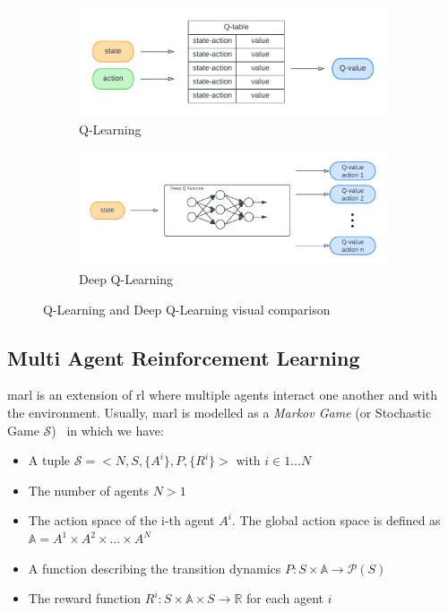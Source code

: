  \begin{figure}[t]
    \begin{subfigure}[b]{0.49\textwidth}
        \centering
        \includegraphics[width=\textwidth]{papers/coordination2023/imgs/q-learning.pdf}
        \caption{Q-Learning}
        \label{fig:ql}
    \end{subfigure}
    \begin{subfigure}[b]{0.49\textwidth}
        \centering
        \includegraphics[width=\textwidth]{papers/coordination2023/imgs/deepQL.pdf}
        \caption{Deep Q-Learning}
        \label{fig:dqn}
    \end{subfigure}
\caption{Q-Learning and Deep Q-Learning visual comparison}\vspace{-10pt}
\end{figure}


\subsection{Multi Agent Reinforcement Learning}
\ac{marl} is an extension of \ac{rl} where multiple agents 
 interact one another and with the environment. 
 Usually, \ac{marl} is modelled as a 
 \emph{Markov Game} (or Stochastic Game $\mathcal{S}$)~\cite{LITTMAN1994157} in which we have:
 \begin{itemize}
    \item A tuple $\mathcal{S} = <N, S, \{A^i\}, P, \{R^i\}>$ with $i \in 1 \dots N$
    \item The number of agents $N > 1$
    \item The action space of the i-th agent $A^i$. The global action space is defined as $\mathbb{A} = A^1 \times A^2 \times \dots \times A^N$
    \item A function describing the transition dynamics $P: S \times \mathbb{A} \rightarrow \mathcal{P}(S)$
    \item The reward function $R^i: S \times \mathbb{A} \times S \rightarrow \mathbb{R}$ for each agent $i$ 
 \end{itemize}

